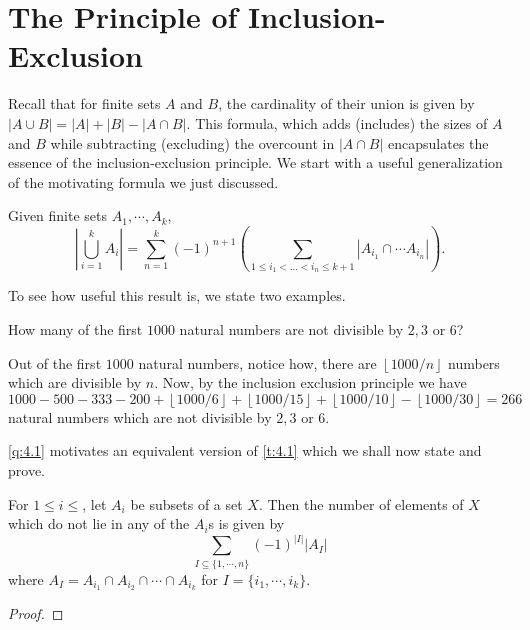 \section{The Principle of Inclusion-Exclusion}
Recall that for finite sets $A$ and $B$, the cardinality of their union is given by $|A \cup B| = |A| + |B| - |A \cap B|
$. This formula, which adds (includes) the sizes of $A$ and $B$ while subtracting (excluding) the overcount in $|A \cap B|$ encapsulates the essence of the inclusion-exclusion principle. We start with a useful generalization of the motivating formula we just discussed.
\begin{theorem}
	Given finite sets $A_{1},\cdots,A_{k}$, 
	\[
		|\bigcup_{i=1}^k A_i| = \sum_{n=1}^{k}\left(-1  \right)^{n+1}\left( \sum_{1\leq i_{1}<\ldots<i_{n}\leq k+1}|A_{i_{1}}\cap \cdots A_{i_{n}}| \right) 
	.\] 
 \label{t:4.1}
\end{theorem}
To see how useful this result is, we state two examples.
\begin{question}
How many of the first $1000$ natural numbers are not divisible by $2,3$ or $6$? \label{q:4.1}
\end{question}
\begin{solution}
Out of the first $1000$ natural numbers, notice how, there are $\left \lfloor{1000/n}\right \rfloor$ numbers which are divisible by $n$. Now, by the inclusion exclusion principle we have 
\[
1000-500-333-200+\left \lfloor{1000/6}\right \rfloor+\left \lfloor{1000/15}\right \rfloor+\left \lfloor{1000/10}\right \rfloor-\left \lfloor{1000/30}\right \rfloor=266
\]
natural numbers which are not divisible by $2,3$ or $6$. 
\end{solution}
\cref{q:4.1} motivates an equivalent version of \cref{t:4.1} which we shall now state and prove.
\begin{theorem}
For $1\leq i\leq$, let $A_i$ be subsets of a set $X$. Then the number of elements of $X$ which do not lie in any of the $A_i$s is given by
\[
\sum_{I\subseteq \{1,\cdots,n\}}(-1)^{|I|}|A_I|
\] where $A_I = A_{i_1}\cap A_{i_2}\cap \cdots \cap A_{i_k}$ for $I=\{i_1,\cdots,i_k\}$. 
\label{t:4.2}
\end{theorem}
\begin{proof}
\end{proof}

